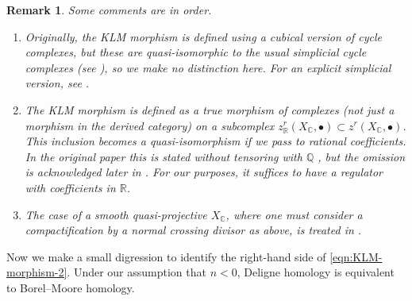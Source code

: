 \documentclass[10pt,a4paper,oneside,draft]{article}
\newcommand{\CC}{\mathbb{C}}
\newcommand{\QQ}{\mathbb{Q}}
\newcommand{\RR}{\mathbb{R}}
\theoremstyle{myplain}
\theoremstyle{mydefinition}
\newtheorem{remark}[theorem]{Remark}
\numberwithin{equation}{section}
\begin{document}
\begin{remark}
  Some comments are in order.

  \begin{enumerate}
  \item Originally, the KLM morphism is defined using a cubical version of cycle
    complexes, but these are quasi-isomorphic to the usual simplicial cycle
    complexes (see \cite{Levine-1994}), so we make no distinction here.
    For an explicit simplicial version, see \cite{Kerr-Lewis-Lopatto-2018}.

  \item The KLM morphism is defined as a true morphism of complexes (not just a
    morphism in the derived category) on a subcomplex
    $z^r_\RR (X_\CC, \bullet) \subset z^r (X_\CC, \bullet)$. This inclusion
    becomes a quasi-isomorphism if we pass to rational coefficients. In the
    original paper \cite{Kerr-Lewis-Muller-Stach-2006} this is stated without
    tensoring with $\QQ$ , but the omission is acknowledged later in
    \cite{Kerr-Lewis-2007}. For our purposes, it suffices to have a regulator
    with coefficients in $\RR$.

  \item The case of a smooth quasi-projective $X_\CC$, where one must consider a
    compactification by a normal crossing divisor as above, is treated in
    \cite[\S 5.9]{Kerr-Lewis-Muller-Stach-2006}.
  \end{enumerate}
\end{remark}

Now we make a small digression to identify the right-hand side of
\eqref{eqn:KLM-morphism-2}. Under our assumption that $n < 0$, Deligne
homology is equivalent to Borel--Moore homology.
\end{document}
